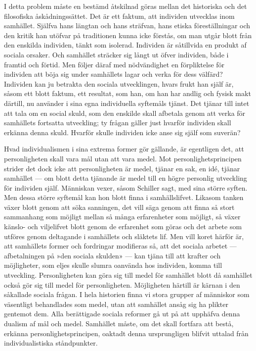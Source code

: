 \documentclass[12pt]{article}
\newcommand{\opage}[1]{\marginnote{\footnotesize\textit{[#1]}}}
\begin{document}
I detta problem måste en bestämd åtskilnad göras mellan det historiska och det filosofiska åskådningssättet. Det är ett faktum, att individen utvecklas inom samhället. Själfva hans längtan och hans sträfvan, hans etiska föreställningar och den kritik han utöfvar på traditionen kunna icke förstås, om man utgår blott från den enskilda individen, tänkt som isolerad. Individen är såtillvida en produkt af sociala orsaker. Och samhället sträcker sig långt ut öfver individen, både i framtid och förtid. Men följer däraf med nödvändighet en förpliktelse för individen att böja sig under samhällets lagar och verka för dess välfärd? Individen kan ju betrakta den sociala utvecklingen, hvars frukt han själf är, såsom ett blott faktum, ett resultat, som han, %
\opage{43}
om han har andlig och fysisk makt därtill, nu använder i sina egna individuella syftemåls tjänst. Det tjänar till intet att tala om en social skuld, som den enskilde skall afbetala genom att verka för samhällets fortsatta utveckling; ty frågan gäller just hvarför individen skall erkänna denna skuld. Hvarför skulle individen icke anse sig själf som suverän?

Hvad individualismen i sina extrema former gör gällande, är egentligen det, att personligheten skall vara mål utan att vara medel. Mot personlighetsprincipen strider det dock icke att personligheten är medel, tjänar en sak, en idé, tjänar samhället --- om blott detta tjänande är medel till en högre personlig utveckling för individen själf. Människan vexer, såsom Schiller sagt, med sina större syften. Men dessa större syftemål kan hon blott finna i samhällslifvet. Likasom tanken växer blott genom att söka sanningen, det vill säga genom att finna så stort sammanhang som möjligt mellan så många erfarenheter som möjligt, så växer känslo- och viljelifvet blott genom de erfarenhet %
som göras och det arbete som utföres genom deltagande i samhällets och släktets lif. Men vill%
\opage{44}
koret härför är, att samhällets former och fordringar modifieras så, att det sociala arbetet --- afbetalningen på »den sociala skulden» --- kan tjäna till att krafter och möjligheter, som eljes skulle slumra oanvända hos individen, komma till utveckling. Personligheten kan göra sig till medel för samhället blott då samhället också gör sig till medel för personligheten. Möjligheten härtill är kärnan i den såkallade sociala frågan. I hela historien finna vi stora grupper af människor som väsentligt behandlades som medel, utan att samhället ansåg sig ha plikter gentemot dem. Alla berättigade sociala reformer gå ut på att upphäfva denna dualism af mål och medel. Samhället måste, om det skall fortfara att bestå, erkänna personlighetsprincipen, oaktadt denna ursprungligen blifvit uttalad från individualistiska ståndpunkter.
\end{document}
